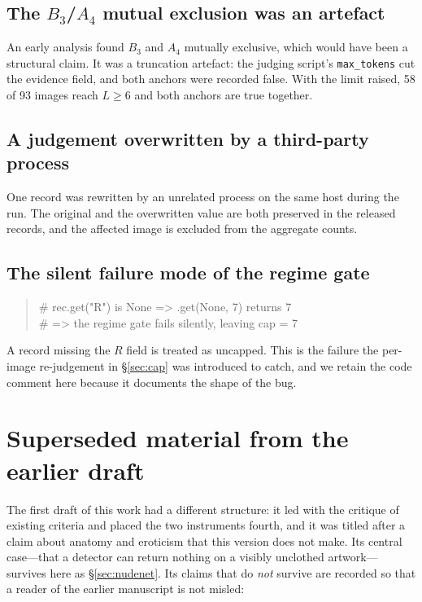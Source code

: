 \subsection{The $B_3$/$A_4$ mutual exclusion was an artefact}

An early analysis found $B_3$ and $A_4$ mutually exclusive, which would have
been a structural claim. It was a truncation artefact: the judging script's
\texttt{max\_tokens} cut the evidence field, and both anchors were recorded
false. With the limit raised, 58 of 93 images reach $L\ge6$ and both anchors
are true together.

\subsection{A judgement overwritten by a third-party process}

One record was rewritten by an unrelated process on the same host during the
run. The original and the overwritten value are both preserved in the released
records, and the affected image is excluded from the aggregate counts.

\subsection{The silent failure mode of the regime gate}

\begin{quote}\small\ttfamily
\# rec.get("R") is None  =>  .get(None, 7) returns 7\\
\# => the regime gate fails silently, leaving cap = 7
\end{quote}

A record missing the $R$ field is treated as uncapped. This is the failure the
per-image re-judgement in \S\ref{sec:cap} was introduced to catch, and we
retain the code comment here because it documents the shape of the bug.

\section{Superseded material from the earlier draft}
\label{app:superseded}

The first draft of this work had a different structure: it led with the
critique of existing criteria and placed the two instruments fourth, and it was
titled after a claim about anatomy and eroticism that this version does not
make. Its central case---that a detector can return nothing on a visibly
unclothed artwork---survives here as \S\ref{sec:nudenet}. Its claims that do
\emph{not} survive are recorded so that a reader of the earlier manuscript is
not misled:

